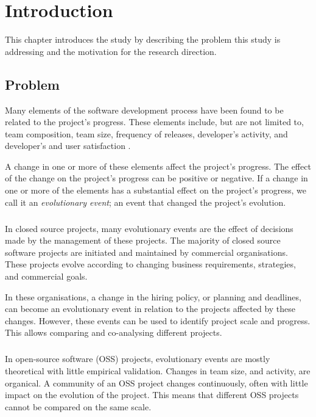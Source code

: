 \chapter{Introduction}
\label{introduction}

This chapter introduces the study by describing the problem this study is
addressing and the motivation for the research direction.

\section{Problem}
Many elements of the software development process have been found to be related
to the project's progress. These elements include, but are not limited to, team
composition, team size, frequency of releases, developer's activity, and
developer's and user satisfaction
\cite{crowston2006}\cite{delone1992}\cite{samoladas2010}.

A change in one or more of these elements affect the project's progress. The
effect of the change on the project's progress can be positive or negative. If a
change in one or more of the elements has a substantial effect on the
project's progress, we call it an \emph{evolutionary event}\rm; an event that
changed the project's evolution.

\paragraph{}
In closed source projects, many evolutionary events are the effect of decisions
made by the management of these projects. The majority of closed source
software projects are initiated and maintained by commercial organisations.
These projects evolve according to changing business requirements, strategies,
and commercial goals.

In these organisations, a change in the hiring policy, or planning and
deadlines, can become an evolutionary event in relation to the projects
affected by these changes. However, these events can be used to identify
project scale and progress. This allows comparing and co-analysing different
projects.

\paragraph{}
In open-source software (OSS) projects, evolutionary events are mostly
theoretical with little empirical validation. Changes in team size, and
activity, are organical. A community of an OSS project changes continuously,
often with little impact on the evolution of the project. This means that
different OSS projects cannot be compared on the same scale.

